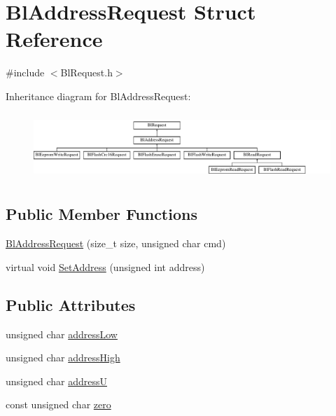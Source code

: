 \hypertarget{struct_bl_address_request}{\section{Bl\-Address\-Request Struct Reference}
\label{struct_bl_address_request}
}


{\ttfamily \#include $<$Bl\-Request.\-h$>$}

Inheritance diagram for Bl\-Address\-Request\-:\begin{figure}[H]
\begin{center}
\leavevmode
\includegraphics[height=2.539683cm]{struct_bl_address_request}
\end{center}
\end{figure}
\subsection*{Public Member Functions}
\begin{DoxyCompactItemize}
\item 
\hyperlink{struct_bl_address_request_aff4bb182ecbd0b573d424db09b9516f2}{Bl\-Address\-Request} (size\-\_\-t size, unsigned char cmd)
\item 
virtual void \hyperlink{struct_bl_address_request_add81e2ca67af34bf1c94e175a57656bf}{Set\-Address} (unsigned int address)
\end{DoxyCompactItemize}
\subsection*{Public Attributes}
\begin{DoxyCompactItemize}
\item 
unsigned char \hyperlink{struct_bl_address_request_ae6a252f564542600cecd8c370ff25955}{address\-Low}
\item 
unsigned char \hyperlink{struct_bl_address_request_a9e30628b0954a18ed75ce920a33d72ee}{address\-High}
\item 
unsigned char \hyperlink{struct_bl_address_request_afd1d17701a5905becce00ef6c0a0dbd0}{address\-U}
\item 
const unsigned char \hyperlink{struct_bl_address_request_a04df4477476757417bfbd0b2b5a30a19}{zero}
\end{DoxyCompactItemize}


